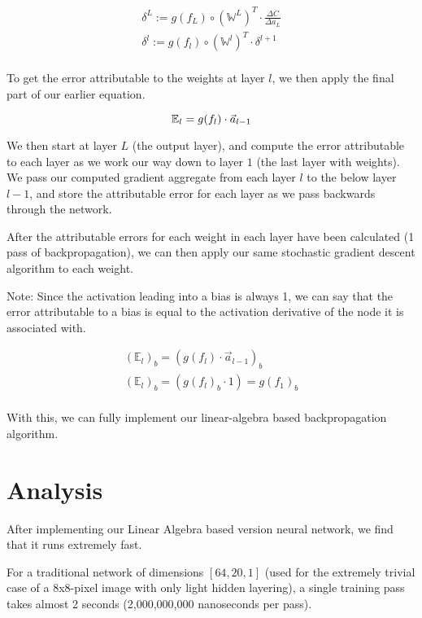 \documentclass[8pt]{amsart}
\newcommand\mat[1]{\mathbb{#1}}
\begin{document}
\[
    \begin{aligned}
        \delta^L := g(f_L) \circ (\mat{W}^L)^T \cdot \frac{ \Delta C }{ \Delta a_L } \\
        \delta^l := g(f_l) \circ (\mat{W}^{l})^T \cdot \delta^{l + 1} \\
    \end{aligned}
\]

To get the error attributable to the weights at layer $l$, we then apply the final part
of our earlier equation.

\[
    \mat{E}_l = g(f_l) \cdot \vec{a}_{l - 1} \\
\]

We then start at layer $L$ (the output layer), and compute the error attributable to
each layer as we work our way down to layer $1$ (the last layer with weights). We pass
our computed gradient aggregate from each layer $l$ to the below layer $l - 1$, and store
the attributable error for each layer as we pass backwards through the network.

After the attributable errors for each weight in each layer have been calculated (1 pass
of backpropagation), we can then apply our same stochastic gradient descent algorithm to
each weight.

Note: Since the activation leading into a bias is always 1, we can say that the error
attributable to a bias is equal to the activation derivative of the node it is associated
with.

\[
    \begin{aligned}
        (\mat{E}_l)_b = (g(f_l) \cdot \vec{a}_{l - 1})_{b} \\
        (\mat{E}_l)_b = (g(f_l)_{b} \cdot 1) = g(f_1)_b \\
    \end{aligned}
\]

With this, we can fully implement our linear-algebra based backpropagation algorithm.

\section{Analysis}

After implementing our Linear Algebra based version neural network, we find that
it runs extremely fast.

For a traditional network of dimensions $[64, 20, 1]$ (used for the extremely
trivial case of a 8x8-pixel image with only light hidden layering), a single training
pass takes almost 2 seconds (2,000,000,000 nanoseconds per pass).
\end{document}

